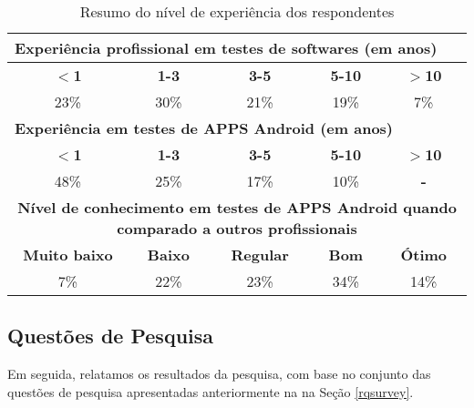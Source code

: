 \begin{table*}[htbp]
\centering
  \def \arraystretch{1.1}
  \footnotesize
  \caption{Resumo do nível de experiência dos respondentes}
    \begin{tabular}{ccccc}
    \toprule
    \multicolumn{5}{l}{\textbf{Experiência profissional em testes de softwares (em anos)}} \\
    \midrule
    \textbf{$<$1} & \textbf{1-3} & \textbf{3-5} & \textbf{5-10} & \textbf{$>$10} \\
    \midrule
    23\%  & 30\%  & 21\%  & 19\%  & 7\% \\
    \midrule
    \multicolumn{5}{l}{\textbf{Experiência em testes de \ac{APPS} Android (em anos)}} \\
    \midrule
    \multicolumn{1}{c}{\textbf{$<$1}} & \textbf{1-3} & \textbf{3-5} & \textbf{5-10} & \textbf{$>$10} \\
    \midrule
    48\%  & 25\%  & 17\%  & 10\%  & {\textbf{-}} \\
    \midrule
    \multicolumn{5}{m{10cm}}{\textbf{Nível de conhecimento em testes de \ac{APPS} Android quando comparado a outros profissionais}} \\
    \midrule
    \textbf{Muito baixo} & \textbf{Baixo} & \textbf{Regular} & \textbf{Bom} & \textbf{Ótimo} \\
    \midrule
    7\%   & 22\%  & 23\%  & 34\%  & 14\% \\
    \bottomrule
    \end{tabular}%
  \label{tab:professionalinformation}%
\end{table*}

\subsection{Questões de Pesquisa}

Em seguida, relatamos os resultados da pesquisa, com base no conjunto das questões de pesquisa apresentadas anteriormente na na Seção \ref{rqsurvey}.

